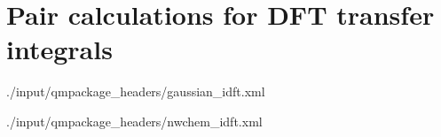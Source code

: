 \section{Pair calculations for DFT transfer integrals}
 {./input/qmpackage_headers/gaussian_idft.xml}

 {./input/qmpackage_headers/nwchem_idft.xml}